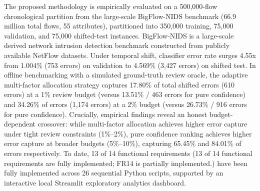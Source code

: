 The proposed methodology is empirically evaluated on a 500,000-flow chronological partition from the large-scale BigFlow-NIDS benchmark (66.9 million total flows, 55 attributes), partitioned into 350,000 training, 75,000 validation, and 75,000 shifted-test instances. BigFlow-NIDS is a large-scale derived network intrusion detection benchmark constructed from publicly available NetFlow datasets. Under temporal shift, classifier error rate surges 4.55x from 1.004\% (753 errors) on validation to 4.569\% (3,427 errors) on shifted test. In offline benchmarking with a simulated ground-truth review oracle, the adaptive multi-factor allocation strategy captures 17.80\% of total shifted errors (610 errors) at a 1\% review budget (versus 13.51\% / 463 errors for pure confidence) and 34.26\% of errors (1,174 errors) at a 2\% budget (versus 26.73\% / 916 errors for pure confidence). Crucially, empirical findings reveal an honest budget-dependent crossover: while multi-factor allocation achieves higher error capture under tight review constraints (1\%--2\%), pure confidence ranking achieves higher error capture at broader budgets (5\%--10\%), capturing 65.45\% and 84.01\% of errors respectively. To date, 13 of 14 functional requirements (13 of 14 functional requirements are fully implemented; FR14 is partially implemented.) have been fully implemented across 26 sequential Python scripts, supported by an interactive local Streamlit exploratory analytics dashboard.

